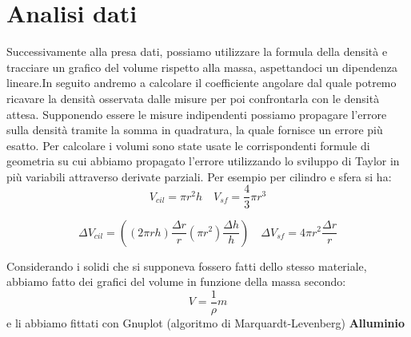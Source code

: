 \documentclass[a4paper,10pt]{article}
\begin{document}
\section{Analisi dati}
Successivamente alla presa dati, possiamo utilizzare la formula della densità e tracciare un grafico del volume rispetto alla massa, aspettandoci un dipendenza lineare.In seguito andremo a 
calcolare il coefficiente angolare dal quale potremo ricavare la densità osservata dalle misure per poi confrontarla con le densità attesa.
Supponendo essere le misure indipendenti possiamo propagare l'errore sulla densità tramite la somma in quadratura, la quale fornisce un errore più esatto. Per calcolare i volumi sono state usate le corrispondenti formule di geometria su cui abbiamo propagato l'errore utilizzando lo sviluppo di Taylor in più variabili attraverso derivate parziali. Per esempio per cilindro e sfera si ha:
\begin{equation}
V_{cil}=\pi r^2  h \quad V_{sf}=\frac{4}{3}  \pi  r^3
\end{equation}

\begin{equation}
 \Delta V_{cil}=((2 \pi  r  h)  \frac{\Delta r}{r}  (\pi  r^2)  \frac{\Delta h}{h}) \quad \Delta V_{sf}=4  \pi  r^2  \frac{\Delta r}{r}
\end{equation}

Considerando i solidi che si supponeva fossero fatti dello stesso materiale, abbiamo fatto dei grafici del volume in funzione della massa secondo:
\begin{equation}
 V=\frac{1}{\rho}  m
\end{equation}
e li abbiamo fittati con Gnuplot (algoritmo di Marquardt-Levenberg)
\textbf {Alluminio}
\end{document}
